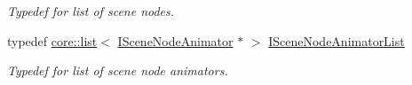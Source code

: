 \begin{DoxyCompactItemize}
\begin{DoxyCompactList}\small\item\em Typedef for list of scene nodes. \end{DoxyCompactList}\item 
\mbox{\label{namespaceirr_1_1scene_aecd4c7f7805ff5dd00c82c770c43e18f}} 
typedef \hyperlink{classirr_1_1core_1_1list}{core\+::list}$<$ \hyperlink{classirr_1_1scene_1_1ISceneNodeAnimator}{I\+Scene\+Node\+Animator} $\ast$ $>$ \hyperlink{namespaceirr_1_1scene_aecd4c7f7805ff5dd00c82c770c43e18f}{I\+Scene\+Node\+Animator\+List}
\begin{DoxyCompactList}\small\item\em Typedef for list of scene node animators. \end{DoxyCompactList}\end{DoxyCompactItemize}
